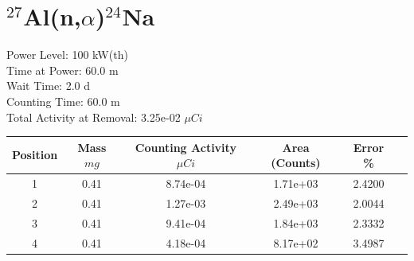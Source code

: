 \newpage

\section*{ $^{27}$Al(n,$\alpha$)$^{24}$Na }

Power Level: 100 kW(th) \\
Time at Power: 60.0 m \\
Wait Time:  2.0 d \\
Counting Time: 60.0 m \\
Total Activity at Removal: 3.25e-02 $\mu Ci$

\begin{table}[h]
\centering
\begin{tabular}{ |c|c|c|c|c|c| }
 \hline
 Position & Mass $mg$ & Counting Activity $\mu Ci$ & Area (Counts) & Error \% \\
 \hline 
 1 & 0.41 & 8.74e-04 & 1.71e+03 & 2.4200 \\ 
\hline
 2 & 0.41 & 1.27e-03 & 2.49e+03 & 2.0044 \\ 
\hline
 3 & 0.41 & 9.41e-04 & 1.84e+03 & 2.3332 \\ 
\hline
 4 & 0.41 & 4.18e-04 & 8.17e+02 & 3.4987 \\ 
\hline
\end{tabular}
\end{table}

